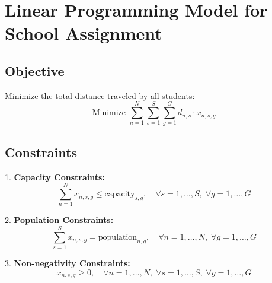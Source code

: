 \documentclass{article}
\begin{document}
\section*{Linear Programming Model for School Assignment}

\subsection*{Objective}
Minimize the total distance traveled by all students:
\[
\text{Minimize } \sum_{n=1}^{N} \sum_{s=1}^{S} \sum_{g=1}^{G} d_{n,s} \cdot x_{n,s,g}
\]

\subsection*{Constraints}
1. \textbf{Capacity Constraints:}
\[
\sum_{n=1}^{N} x_{n,s,g} \leq \text{capacity}_{s,g}, \quad \forall s = 1, \ldots, S, \; \forall g = 1, \ldots, G
\]

2. \textbf{Population Constraints:}
\[
\sum_{s=1}^{S} x_{n,s,g} = \text{population}_{n,g}, \quad \forall n = 1, \ldots, N, \; \forall g = 1, \ldots, G
\]

3. \textbf{Non-negativity Constraints:}
\[
x_{n,s,g} \geq 0, \quad \forall n = 1, \ldots, N, \; \forall s = 1, \ldots, S, \; \forall g = 1, \ldots, G
\]
\end{document}
